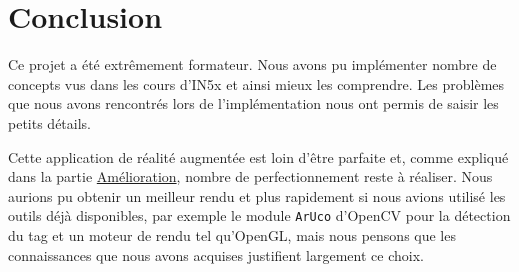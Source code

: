\part*{Conclusion}

Ce projet a été extrêmement formateur. Nous avons pu implémenter nombre de concepts vus dans les cours d'IN5x et ainsi mieux les comprendre. Les problèmes que nous avons rencontrés lors de l'implémentation nous ont permis de saisir les petits détails.

Cette application de réalité augmentée est loin d'être parfaite et, comme expliqué dans la partie \hyperref[part:ameliorations]{Amélioration}, nombre de perfectionnement reste à réaliser. Nous aurions pu obtenir un meilleur rendu et plus rapidement si nous avions utilisé les outils déjà disponibles, par exemple le module \verb|ArUco| d'OpenCV pour la détection du tag et un moteur de rendu tel qu'OpenGL, mais nous pensons que les connaissances que nous avons acquises justifient largement ce choix. 